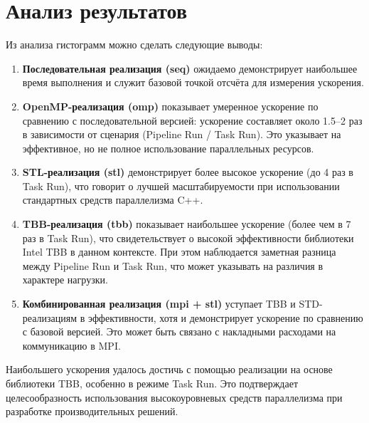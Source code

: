 \documentclass[12pt,a4paper]{article}
\begin{document}
\section{Анализ результатов}
Из анализа гистограмм можно сделать следующие выводы:

\begin{enumerate}
  \item \textbf{Последовательная реализация (seq)} ожидаемо демонстрирует наибольшее время выполнения и служит базовой точкой отсчёта для измерения ускорения.

  \item \textbf{OpenMP-реализация (omp)} показывает умеренное ускорение по сравнению с последовательной версией: ускорение составляет около 1.5--2 раз в зависимости от сценария (Pipeline Run / Task Run). Это указывает на эффективное, но не полное использование параллельных ресурсов.

  \item \textbf{STL-реализация (stl)} демонстрирует более высокое ускорение (до 4 раз в Task Run), что говорит о лучшей масштабируемости при использовании стандартных средств параллелизма C++.

  \item \textbf{TBB-реализация (tbb)} показывает наибольшее ускорение (более чем в 7 раз в Task Run), что свидетельствует о высокой эффективности библиотеки Intel TBB в данном контексте. При этом наблюдается заметная разница между Pipeline Run и Task Run, что может указывать на различия в характере нагрузки.

  \item \textbf{Комбинированная реализация (mpi + stl)} уступает TBB и STD-реализациям в эффективности, хотя и демонстрирует ускорение по сравнению с базовой версией. Это может быть связано с накладными расходами на коммуникацию в MPI.

\end{enumerate}

Наибольшего ускорения удалось достичь с помощью реализации на основе библиотеки TBB, особенно в режиме Task Run. Это подтверждает целесообразность использования высокоуровневых средств параллелизма при разработке производительных решений.
\end{document}
